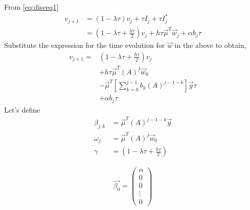 \documentclass{ifacconf}
\begin{document}
From \eqref{eq:disceq1}
\begin{align}
v_{j+1} &= (1-\lambda \tau)v_j + \tau I_j + \tau I_j^{*} \\
&= (1-\lambda \tau + \frac{h\tau}{2})v_j + h\tau\vec{\mu}^T\vec{w}_j + \alpha b_j\tau
\end{align}
Substitute the expression for the time evolution for $\vec{w}$ in the above to obtain,
\begin{align*}
v_{j+1} =& (1-\lambda \tau+ \frac{h\tau}{2})v_j \\
         & + h\tau\vec{\mu}^T(A)^{j}\vec{w}_0 \\
	 & - \vec{\mu}^T\left[ \sum_{k=0}^{j-1} b_{k}(A)^{j-1-k} \right]\vec{g}\tau\\
	 & + \alpha b_j\tau
\end{align*}
Let's define 
\begin{align}
	\beta_{j,k}  &= \vec{\mu}^T (A)^{j-1-k}\vec{g} \\
        \omega_j &=\vec{\mu}^T(A)^{j}\vec{w}_0 \\
        \gamma   &=(1-\lambda \tau+ \frac{h\tau}{2})
\end{align}

\begin{align}
\vec{\beta_0} = \begin{pmatrix} \alpha \\ 0 \\ 0 \\ \vdots \\ 0 \end{pmatrix} \\
\end{align}
\end{document}
